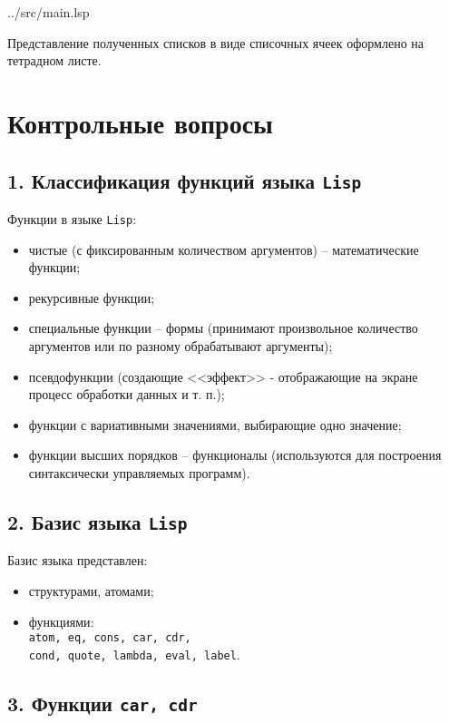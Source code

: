 \begin{lstinputlisting}[
	caption={Задание 4},
	label={lst:t4},
	style={lsp},
	linerange={34-41},
	]{../src/main.lsp}
\end{lstinputlisting}

Представление полученных списков в виде списочных ячеек оформлено на тетрадном листе.

\section*{Контрольные вопросы}

\subsection*{1. Классификация функций языка {\texttt{Lisp}}}

Функции в языке {\texttt{Lisp}}:
\begin{itemize}
	\item чистые (с фиксированным количеством аргументов) -- математические функции;
	\item рекурсивные функции;
	\item специальные функции -- формы (принимают произвольное количество аргументов или по разному обрабатывают аргументы);
	\item псевдофункции (создающие <<эффект>> - отображающие на экране процесс обработки данных и т. п.);
	\item функции с вариативными значениями, выбирающие одно значение;
	\item функции высших порядков -- функционалы (используются для построения синтаксически управляемых программ).
\end{itemize}

\subsection*{2. Базис языка {\texttt{Lisp}}}

Базис языка представлен:
\begin{itemize}
	\item структурами, атомами;
	\item функциями:\\
	{\texttt{atom, eq, cons, car, cdr,}}\\
	{\texttt{cond, quote, lambda, eval, label}}.
\end{itemize}

\subsection*{3. Функции {\texttt{car, cdr}}}

